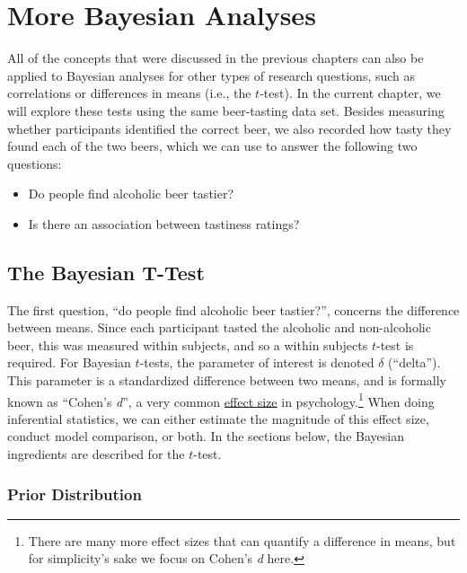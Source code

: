 \documentclass[
  letterpaper,
  DIV=11,
  numbers=noendperiod]{scrreprt}
\providecommand{\tightlist}{%
  \setlength{\itemsep}{0pt}\setlength{\parskip}{0pt}}\usepackage{longtable,booktabs,array}
\begin{document}

\hypertarget{more-bayesian-analyses}{%
\chapter{More Bayesian Analyses}\label{more-bayesian-analyses}}

All of the concepts that were discussed in the previous chapters can
also be applied to Bayesian analyses for other types of research
questions, such as correlations or differences in means (i.e., the
\(t\)-test). In the current chapter, we will explore these tests using
the same beer-tasting data set. Besides measuring whether participants
identified the correct beer, we also recorded how tasty they found each
of the two beers, which we can use to answer the following two
questions:

\begin{itemize}
\tightlist
\item
  Do people find alcoholic beer tastier?
\item
  Is there an association between tastiness ratings?
\end{itemize}

\hypertarget{the-bayesian-t-test}{%
\section{The Bayesian T-Test}\label{the-bayesian-t-test}}

The first question, ``do people find alcoholic beer tastier?'', concerns
the difference between means. Since each participant tasted the
alcoholic and non-alcoholic beer, this was measured within subjects, and
so a within subjects \(t\)-test is required. For Bayesian \(t\)-tests,
the parameter of interest is denoted \(\delta\) (``delta''). This
parameter is a standardized difference between two means, and is
formally known as ``Cohen's \emph{d}'', a very common
\href{https://en.wikipedia.org/wiki/Effect_size}{effect size} in
psychology.\footnote{There are many more effect sizes that can quantify
  a difference in means, but for simplicity's sake we focus on Cohen's
  \emph{d} here.} When doing inferential statistics, we can either
estimate the magnitude of this effect size, conduct model comparison, or
both. In the sections below, the Bayesian ingredients are described for
the \(t\)-test.

\hypertarget{prior-distribution}{%
\subsection{Prior Distribution}\label{prior-distribution}}
\end{document}
